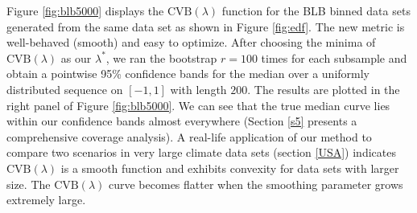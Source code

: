 \documentclass{statsoc}
\begin{document}
Figure \ref{fig:blb5000} displays the $\text{CVB}(\lambda)$ function for the BLB binned data sets generated from the same data set as shown in Figure \ref{fig:edf}. The new metric is well-behaved (smooth) and easy to optimize. After choosing the minima of $\text{CVB}(\lambda)$ as our $\lambda^*$, we ran the bootstrap $r=100$ times for each subsample and obtain a pointwise 95\% confidence bands for the median over a uniformly distributed sequence on $[-1,1]$ with length $200$. The results are plotted in the right panel of Figure \ref{fig:blb5000}. We can see that the true median curve lies within our confidence bands almost everywhere (Section \ref{s5} presents  a comprehensive coverage analysis). A real-life application of our method to compare two scenarios in very large climate data sets (section \ref{USA}) indicates $\text{CVB}(\lambda)$ is a smooth function and exhibits convexity for data sets with larger size. The $\text{CVB}(\lambda)$ curve becomes flatter when the smoothing parameter grows extremely large. 
\end{document}
